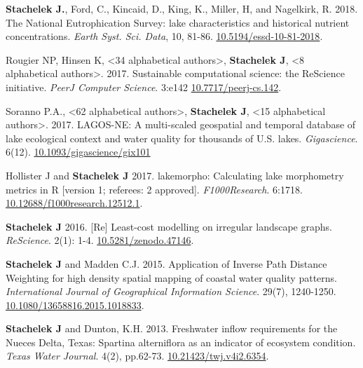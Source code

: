 \item \textbf{Stachelek J.}, Ford, C., Kincaid, D., King, K., Miller, H, and Nagelkirk, R. 2018. The National Eutrophication Survey: lake characteristics and historical nutrient concentrations. \emph{Earth Syst. Sci. Data}, 10, 81-86. \href{https://doi.org/10.5194/essd-10-81-2018}{10.5194/essd-10-81-2018}. %

\item Rougier NP, Hinsen K, <34 alphabetical authors>, \textbf{Stachelek J}, <8 alphabetical authors>. 2017. Sustainable computational science: the ReScience initiative. \emph{PeerJ Computer Science}. 3:e142 \href{https://doi.org/10.7717/peerj-cs.142}{10.7717/peerj-cs.142}. %

\item Soranno P.A., <62 alphabetical authors>, \textbf{Stachelek J}, <15 alphabetical authors>. 2017. LAGOS-NE: A multi-scaled geospatial and temporal database of lake ecological context and water quality for thousands of U.S. lakes. \emph{Gigascience}. 6(12). \href{https://doi.org/10.1093/gigascience/gix101}{10.1093/gigascience/gix101} %

\item Hollister J and \textbf{Stachelek J} 2017. lakemorpho: Calculating lake morphometry metrics in R [version 1; referees: 2 approved]. \emph{F1000Research}. 6:1718. \href{https://doi.org/10.12688/f1000research.12512.1}{10.12688/f1000research.12512.1}. %

\item \textbf{Stachelek J} 2016. [Re] Least-cost modelling on irregular landscape graphs. \emph{ReScience}. 2(1): 1-4. \href{https://github.com/ReScience-Archives/Stachelek-2016/raw/master/article/article.pdf}{10.5281/zenodo.47146}. %

\item \textbf{Stachelek J} and Madden C.J. 2015. Application of Inverse Path Distance Weighting for high density spatial mapping of coastal water quality patterns. \emph{International Journal of Geographical Information Science}. 29(7), 1240-1250. \href{https://doi.org/10.1080/13658816.2015.1018833}{10.1080/13658816.2015.1018833}. %

\item \textbf{Stachelek J} and Dunton, K.H. 2013. Freshwater inflow requirements for the Nueces Delta, Texas: Spartina alterniflora as an indicator of ecosystem condition. \emph{Texas Water Journal}. 4(2), pp.62-73. \href{https://doi.org/10.21423/twj.v4i2.6354}{10.21423/twj.v4i2.6354}. %